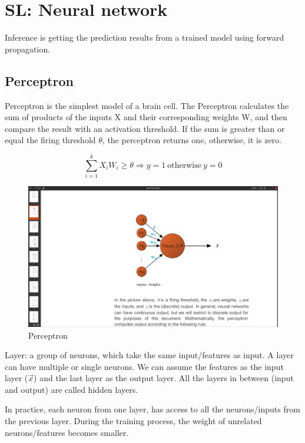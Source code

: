 \documentclass[12pt]{report}
\begin{document}
\section{SL: Neural network}

Inference is getting the prediction results from a trained model using forward propagation.

\subsection{Perceptron}

Perceptron is the simplest model of a brain cell. The Perceptron calculates the sum of products of the inputs X and their corresponding weights W, and then compare the result with an activation threshold. If the sum is greater than or equal the firing threshold $\theta$, the perceptron returns one, otherwise, it is zero.

\begin{equation}
\sum_{i=1}^k X_i W_i \ge \theta  \Rightarrow y = 1 \: \text{otherwise} \: y = 0
\end{equation}

\begin{figure}[H]
	\centering
	\caption{Perceptron}
	\includegraphics[trim =20cm 15.0cm 10cm 8cm, clip, scale=0.2]{pics/perceptron.png}
\end{figure}
Layer: a group of neurons, which take the same input/features as input. A layer can have multiple or single neurons. We can assume the features as the input layer ($\overrightarrow{x}$) and the last layer as the output layer. All the layers in between (input and output) are called hidden layers.

In practice, each neuron from one layer, has access to all the neurons/inputs from the previous layer. During the training process, the weight of unrelated neurons/features becomes smaller.
\end{document}
